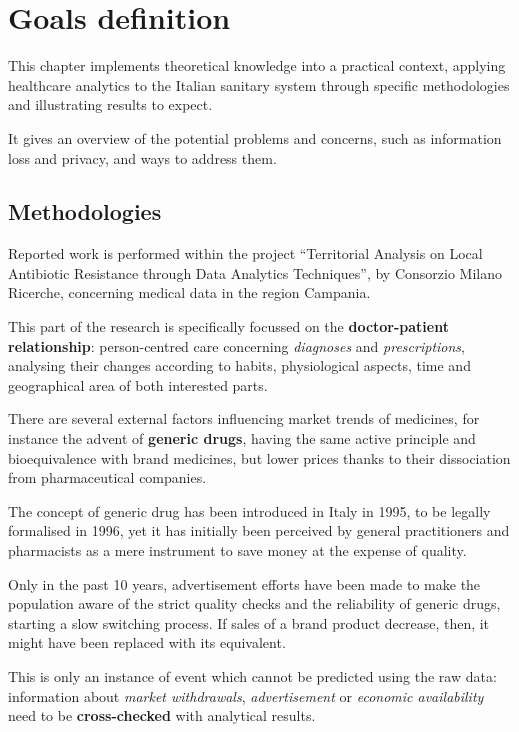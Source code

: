 \chapter{Goals definition} 
This chapter implements theoretical knowledge into a practical context, applying healthcare analytics to the Italian sanitary system through specific methodologies and illustrating results to expect.

It gives an overview of the potential problems and concerns, such as information loss and privacy, and ways to address them.

\section{Methodologies}
Reported work is performed within the project ``Territorial Analysis on Local Antibiotic Resistance through Data Analytics Techniques'', by Consorzio Milano Ricerche, concerning medical data in the region Campania.

This part of the research is specifically focussed on the \textbf{doctor-patient relationship}: person-centred care concerning \textit{diagnoses} and \textit{prescriptions}, analysing their changes according to habits, physiological aspects, time and geographical area of both interested parts. 

There are several external factors influencing market trends of medicines, for instance the advent of \textbf{generic drugs}, having the same active principle and bioequivalence with brand medicines, but lower prices thanks to their dissociation from pharmaceutical companies.

The concept of generic drug has been introduced in Italy in 1995, to be legally formalised in 1996\cite{generico}, yet it has initially been perceived by general practitioners and pharmacists as a mere instrument to save money at the expense of quality\cite{medicinaliequivalenti}.

Only in the past 10 years, advertisement efforts have been made to make the population aware of the strict quality checks and the reliability of generic drugs, starting a slow switching process. If sales of a brand product decrease, then, it might have been replaced with its equivalent.

This is only an instance of event which cannot be predicted using the raw data: information about \textit{market withdrawals}, \textit{advertisement} or \textit{economic availability} need to be \textbf{cross-checked} with analytical results.

